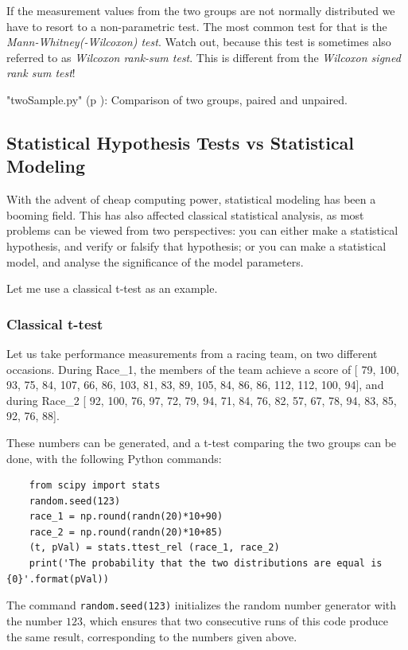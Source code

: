 If the measurement values from the two groups are not normally distributed we have to resort to a non-parametric test. The most common test for that is the \emph{Mann-Whitney(-Wilcoxon) test}. Watch out, because this test is sometimes also referred to as \emph{Wilcoxon rank-sum test}. This is different from the \emph{Wilcoxon signed rank sum test}!

\PyImg "twoSample.py" (p \pageref{py:twoSample}): Comparison of two groups, paired and unpaired.

\subsection{Statistical Hypothesis Tests vs Statistical Modeling}

With the advent of cheap computing power, statistical modeling has been a booming field. This has also affected classical statistical analysis, as most problems can be viewed from two perspectives: you can either make a statistical hypothesis, and verify or falsify that hypothesis; or you can make a statistical model, and analyse the significance of the model parameters.

Let me use a classical t-test as an example.

\subsubsection{Classical t-test}

Let us take performance measurements from a racing team, on two different occasions. During Race\_1, the members of the team achieve a score of [ 79, 100, 93, 75, 84, 107, 66, 86, 103, 81, 83, 89, 105, 84, 86, 86, 112, 112, 100, 94], and during Race\_2 [ 92, 100, 76, 97, 72, 79, 94, 71, 84, 76, 82, 57, 67, 78, 94, 83, 85, 92, 76, 88].

These numbers can be generated, and a t-test comparing the two groups can be done, with the following Python commands:

\begin{lstlisting}
    from scipy import stats
    random.seed(123)
    race_1 = np.round(randn(20)*10+90)
    race_2 = np.round(randn(20)*10+85)
    (t, pVal) = stats.ttest_rel (race_1, race_2)
    print('The probability that the two distributions are equal is {0}'.format(pVal))
\end{lstlisting}

The command \lstinline{random.seed(123)} initializes the random number generator with the number $123$, which ensures that two consecutive runs of this code produce the same result, corresponding to the numbers given above.

